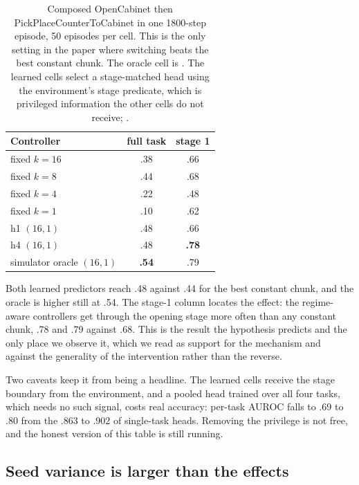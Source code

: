 \begin{table}[t]
\centering
\small
\begin{tabular}{lcc}
\toprule
Controller & full task & stage 1 \\
\midrule
fixed $k{=}16$ & .38 & .66 \\
fixed $k{=}8$ & .44 & .68 \\
fixed $k{=}4$ & .22 & .48 \\
fixed $k{=}1$ & .10 & .62 \\
\midrule
h1 $(16,1)$ & .48 & .66 \\
h4 $(16,1)$ & .48 & \textbf{.78} \\
simulator oracle $(16,1)$ & \textbf{.54} & .79 \\
\bottomrule
\end{tabular}
\caption{Composed OpenCabinet then PickPlaceCounterToCabinet in one 1800-step
episode, 50 episodes per cell. This is the only setting in the paper where
switching beats the best constant chunk. The oracle cell is
. The learned cells select a
stage-matched head using the environment's stage predicate, which is
privileged information the other cells do not receive;
.}
\label{tab:composed}
\end{table}

Both learned predictors reach .48 against .44 for the best constant chunk, and
the oracle is higher still at .54. The stage-1 column locates the effect: the
regime-aware controllers get through the opening stage more often than any
constant chunk, .78 and .79 against .68. This is the result the hypothesis
predicts and the only place we observe it, which we read as support for the
mechanism and against the generality of the intervention rather than the
reverse.

Two caveats keep it from being a headline. The learned cells receive the stage
boundary from the environment, and a pooled head trained over all four tasks,
which needs no such signal, costs real accuracy: per-task AUROC falls to .69
to .80 from the .863 to .902 of single-task heads. Removing the privilege is
not free, and the honest version of this table is still running.

\subsection{Seed variance is larger than the effects}

